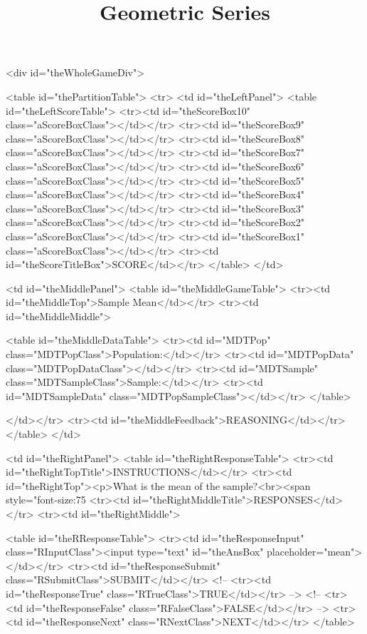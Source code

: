 \documentclass{ximera}
\title{Geometric Series}
\begin{document}
\begin{abstract}
\end{abstract}
\maketitle






<div id="theWholeGameDiv">

<table id="thePartitionTable">
<tr>
<td id="theLeftPanel">
	<table id="theLeftScoreTable">
	<tr><td id="theScoreBox10" class="aScoreBoxClass"></td></tr>
	<tr><td id="theScoreBox9" class="aScoreBoxClass"></td></tr>
	<tr><td id="theScoreBox8" class="aScoreBoxClass"></td></tr>
	<tr><td id="theScoreBox7" class="aScoreBoxClass"></td></tr>
	<tr><td id="theScoreBox6" class="aScoreBoxClass"></td></tr>
	<tr><td id="theScoreBox5" class="aScoreBoxClass"></td></tr>
	<tr><td id="theScoreBox4" class="aScoreBoxClass"></td></tr>
	<tr><td id="theScoreBox3" class="aScoreBoxClass"></td></tr>
	<tr><td id="theScoreBox2" class="aScoreBoxClass"></td></tr>
	<tr><td id="theScoreBox1" class="aScoreBoxClass"></td></tr>
	<tr><td id="theScoreTitleBox">SCORE</td></tr>
	</table>
</td>





<td id="theMiddlePanel">
	<table id="theMiddleGameTable">
	<tr><td id="theMiddleTop">Sample Mean</td></tr>
	<tr><td id="theMiddleMiddle">
	
	
		<table id="theMiddleDataTable">
		<tr><td id="MDTPop" class="MDTPopClass">Population:</td></tr>
		<tr><td id="MDTPopData" class="MDTPopDataClass"></td></tr>
		<tr><td id="MDTSample" class="MDTSampleClass">Sample:</td></tr>
		<tr><td id="MDTSampleData" class="MDTPopSampleClass"></td></tr>
		</table>
	
	
	
	</td></tr>
	<tr><td id="theMiddleFeedback">REASONING</td></tr>
	</table>
</td>






<td id="theRightPanel">
	<table id="theRightResponseTable">
	<tr><td id="theRightTopTitle">INSTRUCTIONS</td></tr>
	<tr><td id="theRightTop"><p>What is the mean of the sample?<br><span style="font-size:75%
	<tr><td id="theRightMiddleTitle">RESPONSES</td></tr>
	<tr><td id="theRightMiddle">
	
		
		<table id="theRResponseTable">
		<tr><td id="theResponseInput" class="RInputClass"><input type="text" id="theAnsBox" placeholder="mean"></td></tr>
		<tr><td id="theResponseSubmit" class="RSubmitClass">SUBMIT</td></tr> 
		<!-- <tr><td id="theResponseTrue" class="RTrueClass">TRUE</td></tr> -->
		<!-- <tr><td id="theResponseFalse" class="RFalseClass">FALSE</td></tr> -->
		<tr><td id="theResponseNext" class="RNextClass">NEXT</td></tr>
		</table>
		
\end{document}
